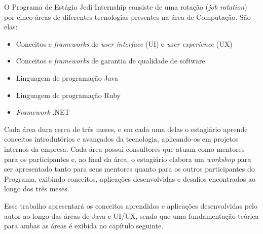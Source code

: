 O Programa de Estágio Jedi Internship consiste de uma rotação (\textit{job rotation}) por cinco áreas de diferentes tecnologias presentes na área de Computação. São elas:

\begin{itemize}
	\item Conceitos e \textit{frameworks} de \textit{user interface} (UI) e \textit{user experience} (UX)
	\item Conceitos e \textit{frameworks} de garantia de qualidade de software
	\item Linguagem de programação Java
	\item Linguagem de programação Ruby
	\item \textit{Framework} .NET
\end{itemize}

Cada área dura cerca de três meses, e em cada uma delas o estagiário aprende conceitos introdutórios e avançados da tecnologia, aplicando-os em projetos internos da empresa. Cada área possui consultores que atuam como mentores para os participantes e, ao final da área, o estagiário elabora um \textit{workshop} para ser apresentado tanto para seus mentores quanto para os outros participantes do Programa, exibindo conceitos, aplicações desenvolvidas e desafios encontrados ao longo dos três meses.

Esse trabalho apresentará os conceitos aprendidos e aplicações desenvolvidas pelo autor ao longo das áreas de Java e UI/UX, sendo que uma fundamentação teórica para ambas as áreas é exibida no capítulo seguinte.